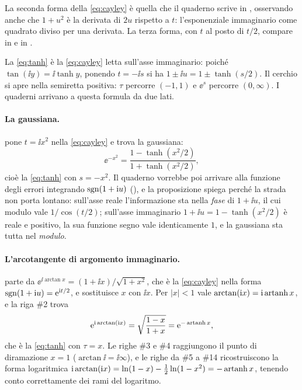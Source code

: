 La seconda forma della \eqref{eq:cayley} \`e quella che il quaderno scrive in
, osservando anche che $1+u^2$ \`e la derivata di
$2u$ rispetto a $t$: l'esponenziale immaginario come quadrato diviso per una
derivata. La terza forma, con $t$ al posto di $t/2$, compare in
 e in .

La \eqref{eq:tanh} \`e la \eqref{eq:cayley} letta sull'asse immaginario:
poich\'e $\tan(\ii y)=\ii\tanh y$, ponendo $t=-\ii s$ si ha
$1\pm\ii u=1\pm\tanh(s/2)$. Il cerchio si apre nella semiretta positiva:
$\tau$ percorre $(-1,1)$ e $\ee^{s}$ percorre $(0,\infty)$. I quaderni
arrivano a questa formula da due lati.

\paragraph{La gaussiana.}
 pone $t=\ii x^2$ nella \eqref{eq:cayley} e trova la
gaussiana:
\[
  \ee^{-x^2}=\frac{1-\tanh(x^2/2)}{1+\tanh(x^2/2)} ,
\]
cio\`e la \eqref{eq:tanh} con $s=-x^2$. Il quaderno vorrebbe poi arrivare
alla funzione degli errori integrando $\operatorname{sgn}(1+\mathrm{i} u)$
(), e la proposizione spiega perch\'e la strada non
porta lontano: sull'asse reale l'informazione sta nella \emph{fase} di
$1+\ii u$, il cui modulo vale $1/\cos(t/2)$; sull'asse immaginario
$1+\ii u=1-\tanh(x^2/2)$ \`e reale e positivo, la sua funzione segno vale
identicamente $1$, e la gaussiana sta tutta nel \emph{modulo}.

\paragraph{L'arcotangente di argomento immaginario.}
 parte da $\ee^{\ii\arctan x}=(1+\ii x)/\sqrt{1+x^2}$,
che \`e la \eqref{eq:cayley} nella forma $\operatorname{sgn}(1+\mathrm{i} u)=\mathrm{e}^{\mathrm{i} t/2}$, e
sostituisce $x$ con $\ii x$. Per $|x|<1$ vale $\arctan(\mathrm{i} x)=\mathrm{i}\operatorname{artanh} x$, e
la riga \#2 trova
\[
  \mathrm{e}^{\mathrm{i}\arctan(\mathrm{i} x)}=\sqrt{\frac{1-x}{1+x}}=\mathrm{e}^{-\operatorname{artanh} x},
\]
che \`e la \eqref{eq:tanh} con $\tau=x$. Le righe \#3 e \#4 raggiungono il
punto di diramazione $x=1$ ($\arctan\ii=\ii\infty$), e le righe da \#5 a \#14
ricostruiscono la forma logaritmica
$\mathrm{i}\arctan(\mathrm{i} x)=\ln(1-x)-\tfrac12\ln(1-x^2)=-\operatorname{artanh} x$, tenendo conto
correttamente dei rami del logaritmo.

